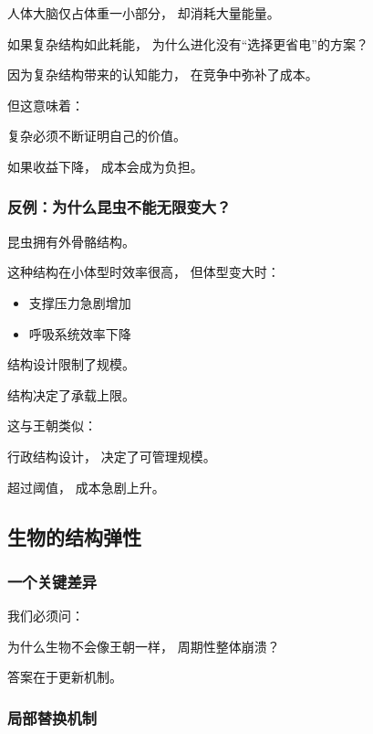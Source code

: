 \documentclass[openany, a4paper, 12pt]{book}
\begin{document}
人体大脑仅占体重一小部分，
却消耗大量能量。

\begin{questionbox}
	如果复杂结构如此耗能，
	为什么进化没有“选择更省电”的方案？
\end{questionbox}

因为复杂结构带来的认知能力，
在竞争中弥补了成本。

但这意味着：

复杂必须不断证明自己的价值。

如果收益下降，
成本会成为负担。

\subsubsection{反例：为什么昆虫不能无限变大？}

昆虫拥有外骨骼结构。

这种结构在小体型时效率很高，
但体型变大时：

\begin{itemize}
	\item 支撑压力急剧增加
	\item 呼吸系统效率下降
\end{itemize}

结构设计限制了规模。

\begin{readingnote}
	结构决定了承载上限。
\end{readingnote}

这与王朝类似：

行政结构设计，
决定了可管理规模。

超过阈值，
成本急剧上升。

\subsection{生物的结构弹性}

\subsubsection{一个关键差异}

我们必须问：

\begin{questionbox}
	为什么生物不会像王朝一样，
	周期性整体崩溃？
\end{questionbox}

答案在于更新机制。

\subsubsection{局部替换机制}
\end{document}
